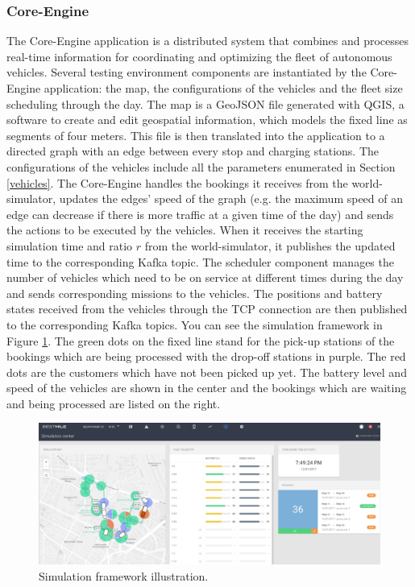 \documentclass[12pt,a4paper]{article}
\begin{document}
\subsubsection{Core-Engine}
The Core-Engine application is a distributed system that combines and processes real-time information for coordinating and optimizing the fleet of autonomous vehicles. Several testing environment components are instantiated by the Core-Engine application: the map, the configurations of the vehicles and the fleet size scheduling through the day. The map is a GeoJSON file generated with QGIS, a software to create and edit geospatial information, which models the fixed line as segments of four meters. This file is then translated into the application to a directed graph with an edge between every stop and charging stations. The configurations of the vehicles include all the parameters enumerated in Section \ref{vehicles}. The Core-Engine handles the bookings it receives from the world-simulator, updates the edges' speed of the graph (e.g. the maximum speed of an edge can decrease if there is more traffic at a given time of the day) and sends the actions to be executed by the vehicles. When it receives the starting simulation time and ratio $r$ from the world-simulator, it publishes the updated time to the corresponding Kafka topic. The scheduler component manages the number of vehicles which need to be on service at different times during the day and sends corresponding missions to the vehicles. The positions and battery states received from the vehicles through the TCP connection are then published to the corresponding Kafka topics. You can see the simulation framework in Figure \ref{fig:simu}. The green dots on the fixed line stand for the pick-up stations of the bookings which are being processed with the drop-off stations in purple. The red dots are the customers which have not been picked up yet. The battery level and speed of the vehicles are shown in the center and the bookings which are waiting and being processed are listed on the right.

\begin{figure} 
  \centering
\includegraphics[width=\textwidth]{./images/coreengine.pdf}
\caption{Simulation framework illustration.}
\label{fig:simu}
\end{figure}
\end{document}
